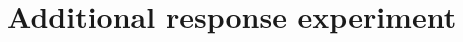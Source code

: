 \documentclass[10pt,twocolumn]{article}
\begin{document}
\appendix
\section{Additional response experiment}

\end{document}
